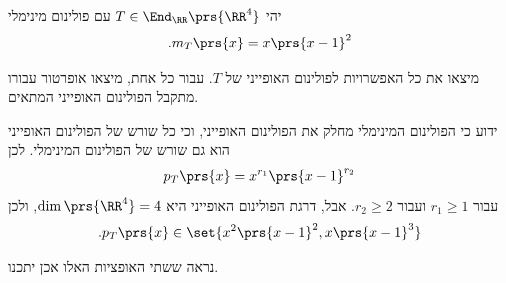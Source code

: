 \documentclass[a4paper,10pt,twoside,openany]{book}
\begin{document}
\begin{exercisechap}
יהי
$T \in \End_\RR\prs{\RR^4}$
עם פולינום מינימלי
\begin{align*}
\text{.} m_T\prs{x} = x \prs{x-1}^2
\end{align*}

מיצאו את כל האפשרויות לפולינום האופייני של
$T$.
עבור כל אחת, מיצאו אופרטור עבורו מתקבל הפולינום האופייני המתאים.
\end{exercisechap}

\begin{solution}
ידוע כי הפולינום המינימלי מחלק את הפולינום האופייני, וכי כל שורש של הפולינום האופייני הוא גם שורש של הפולינום המינימלי. לכן
\begin{align*}
p_T\prs{x} = x^{r_1} \prs{x-1}^{r_2}
\end{align*}
עבור
$r_1 \geq 1$
ועבור
$r_2 \geq 2$.
אבל, דרגת הפולינום האופייני היא
$\dim\prs{\RR^4} = 4$,
ולכן
\begin{align*}
\text{.} p_T\prs{x} \in \set{x^2 \prs{x-1}^2, x \prs{x-1}^3}
\end{align*}

נראה ששתי האופציות האלו אכן יתכנו.


\end{solution}
\end{document}
